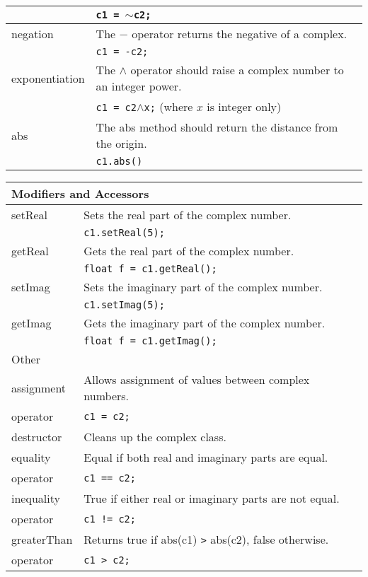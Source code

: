 \documentclass[11pt]{article}
\begin{document}
\begin{tabular}{|p{1in}|p{4in}|}
& \texttt{c1 = $\sim$c2;} \\
\hline
negation & The $-$ operator returns the negative of a complex.  \\
& \texttt{c1 = -c2;} \\
\hline
exponentiation & The $\wedge$ operator should raise a complex number to an integer power. \\
& \texttt{c1 = c2$\wedge$x;} (where $x$ is integer only)\\
\hline
abs & The abs method should return the distance from the origin. \\
& \texttt{c1.abs()}  \\
\hline
\end{tabular}

\begin{tabular}{|p{1in}|p{4in}|}
\hline
\multicolumn{2}{|l|}{Modifiers and Accessors} \\ \hline
setReal & Sets the real part of the complex number. \\
   & \texttt{c1.setReal(5);} \\
\hline
getReal & Gets the real part of the complex number. \\
   & \texttt{float f = c1.getReal();} \\
\hline
setImag & Sets the imaginary part of the complex number. \\
   & \texttt{c1.setImag(5);} \\
\hline
getImag & Gets the imaginary part of the complex number. \\
   & \texttt{float f = c1.getImag();} \\
\hline
\hline
\multicolumn{2}{|l|}{Other} \\ \hline
assignment & Allows assignment of values between complex numbers. \\
operator & \texttt{c1 = c2;} \\
\hline
destructor & Cleans up the complex class. \\
\hline
equality & Equal if both real and imaginary parts are equal. \\
operator & \texttt{c1 == c2;}  \\
\hline
inequality &True if either real or imaginary parts are not equal. \\
operator & \texttt{c1 != c2;} \\
\hline
greaterThan & Returns true if abs(c1) \texttt{>} abs(c2), false otherwise. \\
operator & \texttt{c1 > c2;} \\
\hline

\end{tabular}
\end{document}
